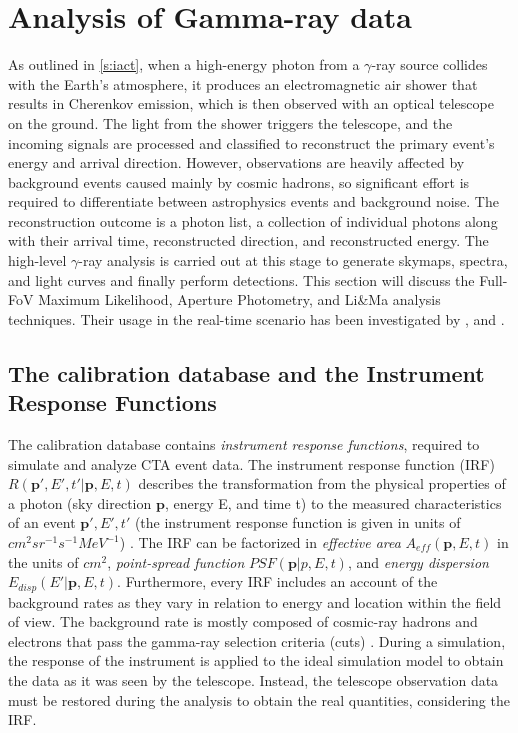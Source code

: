 \section{Analysis of Gamma-ray data}
\label{s:gamma-ray-data-analysis}
As outlined in \autoref{s:iact}, when a high-energy photon from a $\gamma$-ray source collides with the Earth's atmosphere, it produces an electromagnetic air shower that results in Cherenkov emission, which is then observed with an optical telescope on the ground. The light from the shower triggers the telescope, and the incoming signals are processed and classified to reconstruct the primary event's energy and arrival direction. However, observations are heavily affected by background events caused mainly by cosmic hadrons, so significant effort is required to differentiate between astrophysics events and background noise. The reconstruction outcome is a photon list, a collection of individual photons along with their arrival time, reconstructed direction, and reconstructed energy. The  high-level $\gamma$-ray analysis is carried out at this stage to generate skymaps, spectra, and light curves and finally perform detections. This section will discuss the Full-FoV Maximum Likelihood, Aperture Photometry, and Li\&Ma analysis techniques. Their usage in the real-time scenario has been investigated by \cite{tampieri2020real}, \cite{di2020detection} and \cite{di2021detection}. 

\subsection{The calibration database and the Instrument Response Functions}
\label{ss:caldb}
The calibration database contains \textit{instrument response functions}, required to simulate and analyze CTA event data. The instrument response function (IRF) $R(\bm{p}',E',t'|\bm{p}, E, t)$ describes the transformation from the physical properties of a photon (sky direction $\bm{p}$, energy E, and time t) to the measured characteristics of an event $\bm{p'},E',t'$ (the instrument response function is given in units of $cm^2 sr^{-1} s^{-1} MeV^{-1}$) \cite{Knodlseder_2016}. 
The IRF can be factorized in \textit{effective area} $A_{eff}(\bm{p},E,t)$ in the units of $cm^2$, \textit{point-spread function} $PSF(\bm{p}|p,E,t)$, and \textit{energy dispersion} $E_{disp}(E'|\bm{p},E,t)$. Furthermore, every IRF includes an account of the background rates as they vary in relation to energy and location within the field of view. The background rate is mostly composed of cosmic-ray hadrons and electrons that pass the gamma-ray selection criteria (cuts) \cite{di2020detection}. During a simulation, the response of the instrument is applied to the ideal simulation model  to obtain the data as it was seen by the telescope. Instead, the telescope observation data must be restored during the analysis to obtain the real quantities, considering the IRF.

